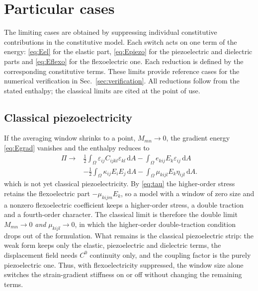 \FloatBarrier
\section{Particular cases}
\label{sec:limits}

The limiting cases are obtained by suppressing individual constitutive
contributions in the constitutive model. Each
switch acts on one term of the energy: \eqref{eq:Eel} for the elastic part,
\eqref{eq:Epiezo} for the piezoelectric and dielectric parts and
\eqref{eq:Eflexo} for the flexoelectric one. Each reduction is defined by the corresponding constitutive terms. These limits provide reference cases for the numerical verification in Sec.~\ref{sec:verification}.
All reductions follow from the stated enthalpy;
the classical limits are cited at the point of use.

\FloatBarrier
\subsection{Classical piezoelectricity}
\label{sec:limit_classical}

If the averaging window shrinks to a point, $M_{mn}\to0$, the gradient energy
\eqref{eq:Egrad} vanishes and the enthalpy reduces to
\begin{equation}
  \begin{aligned}
  \Pi \to {}&\tfrac12\int_\Omega \varepsilon_{ij} C_{ijkl}\varepsilon_{kl}
    \,\mathrm{d}A - \int_\Omega e_{kij}E_k\varepsilon_{ij}\,\mathrm{d}A\\
    &- \tfrac12\int_\Omega\kappa_{ij}E_iE_j\,\mathrm{d}A
    - \int_\Omega \mu_{kijl}E_k\eta_{ijl}\,\mathrm{d}A .
  \end{aligned}
  \label{eq:limitM}
\end{equation}
which is not yet classical piezoelectricity. By \eqref{eq:tau} the
higher-order stress retains the flexoelectric part $-\mu_{kijm}E_k$, so a model
with a window of zero size and a nonzero flexoelectric coefficient keeps a
higher-order stress, a double traction and a fourth-order character. The
classical limit is therefore the double limit $M_{mn}\to0$ \emph{and}
$\mu_{kijl}\to0$, in which the higher-order double-traction condition drops out of the formulation. What remains is the classical
piezoelectric strip: the weak form keeps only the elastic, piezoelectric and
dielectric terms, the displacement field needs $C^0$ continuity only, and the
coupling factor is the purely piezoelectric one. Thus, with flexoelectricity suppressed, the window size alone switches the
strain-gradient stiffness on or off without changing the remaining terms.

